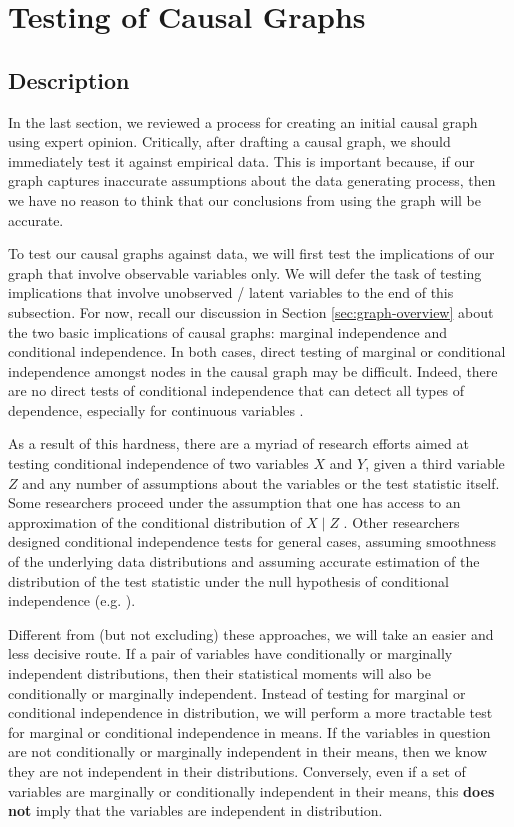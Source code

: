 \section{Testing of Causal Graphs}
\label{sec:graph-testing}

\subsection{Description}
\label{sec:testing-description}
In the last section, we reviewed a process for creating an initial causal graph using expert opinion.
Critically, after drafting a causal graph, we should immediately test it against empirical data.
This is important because, if our graph captures inaccurate assumptions about the data generating process, then we have no reason to think that our conclusions from using the graph will be accurate.

To test our causal graphs against data, we will first test the implications of our graph that involve observable variables only.
We will defer the task of testing implications that involve unobserved / latent variables to the end  of this subsection.
For now, recall our discussion in Section \ref{sec:graph-overview} about the two basic implications of causal graphs: marginal independence and conditional independence.
In both cases, direct testing of marginal or conditional independence amongst nodes in the causal graph may be difficult.
Indeed, there are no direct tests of conditional independence that can detect all types of dependence, especially for continuous variables \citep{bergsma_2004_testing, shah_2020_hardness}.

As a result of this hardness, there are a myriad of research efforts aimed at testing conditional independence of two variables $X$ and $Y$, given a third variable $Z$ and any number of assumptions about the variables or the test statistic itself.
Some researchers proceed under the assumption that one has access to an approximation of the conditional distribution of $X \mid Z$ \citep{candes_2018_panning, berrett_2019_conditional}.
Other researchers designed conditional independence tests for general cases, assuming smoothness of the underlying data distributions and assuming accurate estimation of the distribution of the test statistic under the null hypothesis of conditional independence (e.g. \citet{zhang_2012_kernel, strobl_2019_approximate}).

Different from (but not excluding) these approaches, we will take an easier and less decisive route.
If a pair of variables have conditionally or marginally independent distributions, then their statistical moments will also be conditionally or marginally independent.
Instead of testing for marginal or conditional independence in distribution, we will perform a more tractable test for marginal or conditional independence in means.
If the variables in question are not conditionally or marginally independent in their means, then we know they are not independent in their distributions.
Conversely, even if a set of variables are marginally or conditionally independent in their means, this \textbf{does not} imply that the variables are independent in distribution.

